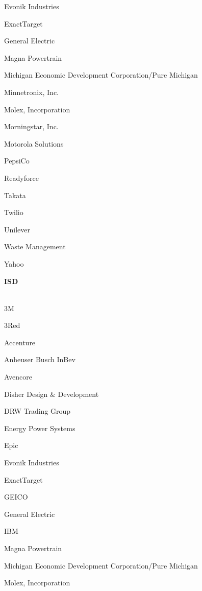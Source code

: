 \documentclass[twoside]{article}
\begin{document}
\begin{center}
\begin{multicols}{5}
\begin{FlushLeft}
\begin{compactitem}
\item Evonik Industries
\item ExactTarget
\item General Electric
\item Magna Powertrain
\item Michigan Economic Development Corporation/Pure Michigan
\item Minnetronix, Inc.
\item Molex, Incorporation
\item Morningstar, Inc.
\item Motorola Solutions
\item PepsiCo
\item Readyforce
\item Takata
\item Twilio
\item Unilever
\item Waste Management
\item Yahoo
\end{compactitem}
        \end{FlushLeft}
        \vspace{1em}
        {\fontsize{14}{16}\selectfont \bf ISD}\\
        \vspace{-1em}
        ~\hrulefill~
        \vspace{-.9em}
        \begin{FlushLeft}
        \begin{compactitem}
        \item 3M
\item 3Red
\item Accenture
\item Anheuser Busch InBev
\item Avencore
\item Disher Design \& Development
\item DRW Trading Group
\item Energy Power Systems
\item Epic
\item Evonik Industries
\item ExactTarget
\item GEICO
\item General Electric
\item IBM
\item Magna Powertrain
\item Michigan Economic Development Corporation/Pure Michigan
\item Molex, Incorporation

\end{compactitem}
\end{FlushLeft}
\end{multicols}
\end{center}
\end{document}
